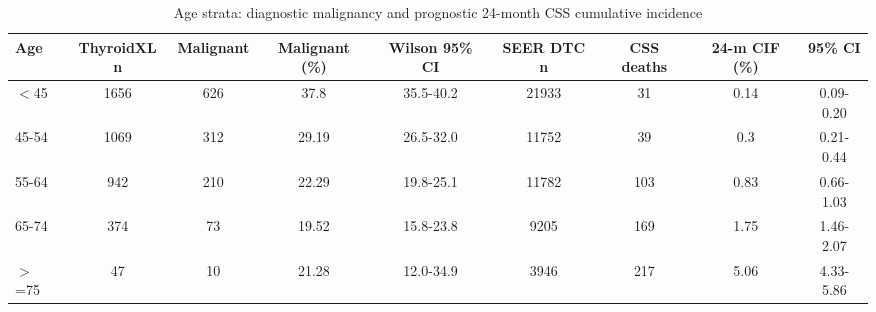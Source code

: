 \begin{table}[htbp]
\caption{Age strata: diagnostic malignancy and prognostic 24-month CSS cumulative incidence}\label{tab:s14_age_strata}
\scriptsize
\begin{tabular*}{\textwidth}{@{\extracolsep{\fill}}lcccccccc@{}}
\toprule
Age & ThyroidXL n & Malignant & Malignant (\%) & Wilson 95\% CI & SEER DTC n & CSS deaths & 24-m CIF (\%) & 95\% CI \\
\midrule
$<$45 & 1656 & 626 & 37.8 & 35.5-40.2 & 21933 & 31 & 0.14 & 0.09-0.20 \\
45-54 & 1069 & 312 & 29.19 & 26.5-32.0 & 11752 & 39 & 0.3 & 0.21-0.44 \\
55-64 & 942 & 210 & 22.29 & 19.8-25.1 & 11782 & 103 & 0.83 & 0.66-1.03 \\
65-74 & 374 & 73 & 19.52 & 15.8-23.8 & 9205 & 169 & 1.75 & 1.46-2.07 \\
$>$=75 & 47 & 10 & 21.28 & 12.0-34.9 & 3946 & 217 & 5.06 & 4.33-5.86 \\
\bottomrule
\end{tabular*}
\smallskip{}
\end{table}
